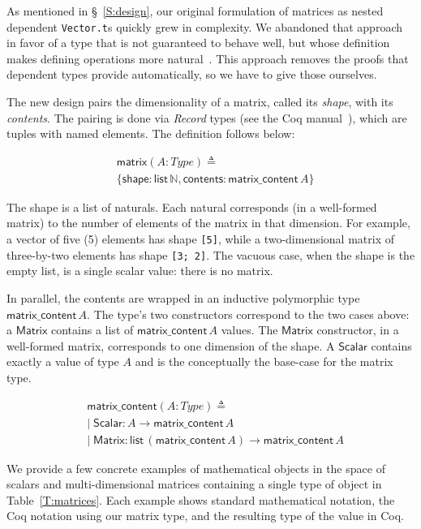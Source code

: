 \documentclass[11pt,conference]{IEEEtran}
\newcommand{\var}[1]{\mathit{#1}}
\newcommand{\func}[1]{\mathsf{#1}}
\theoremstyle{plain} %
\theoremstyle{definition}
\theoremstyle{remark}
\begin{document}
As mentioned in \S~\ref{S:design}, our original formulation of matrices as
nested dependent \texttt{Vector.t}s quickly grew in complexity. We abandoned
that approach in favor of a type that is not guaranteed to behave well, but
whose definition makes defining operations more natural~\cite{SO_2021_2}. This
approach removes the proofs that dependent types provide automatically, so we
have to give those ourselves.

The new design pairs the dimensionality of a matrix, called its \emph{shape},
with its \emph{contents}. The pairing is done via \emph{Record} types (see the
Coq manual~\cite{Coq}), which are tuples with named elements. The definition
follows below:

\begin{align*}
    & \func{matrix} (\var{A}: \var{Type}) \triangleq \\
    & \{
        \func{shape}: \func{list}\, \mathbb{N},
        \func{contents}: \func{matrix\_content}\, \var{A}
    \}
\end{align*}

The shape is a list of naturals. Each natural corresponds (in a well-formed
matrix) to the number of elements of the matrix in that dimension. For example,
a vector of five (5) elements has shape \texttt{[5]}, while a two-dimensional
matrix of three-by-two elements has shape \texttt{[3; 2]}. The vacuous case,
when the shape is the empty list, is a single scalar value: there is no matrix.

In parallel, the contents are wrapped in an inductive polymorphic type
\(\func{matrix\_content}\, \var{A}\). The type's two constructors correspond to
the two cases above: a \(\func{Matrix}\) contains a list of
\(\func{matrix\_content}\, \var{A}\) values. The \(\func{Matrix}\) constructor,
in a well-formed matrix, corresponds to one dimension of the shape. A
\(\func{Scalar}\) contains exactly a value of type \(\var{A}\) and is the
conceptually the base-case for the matrix type.

\begin{align*}
    & \func{matrix\_content} (\var{A}: \var{Type}) \triangleq\; \\
    & |\; \func{Scalar}: \var{A} \to \func{matrix\_content}\, \var{A} \\
    & |\; \func{Matrix}: \func{list}\, (\func{matrix\_content}\, \var{A}) \to \func{matrix\_content}\, \var{A}
\end{align*}

We provide a few concrete examples of mathematical objects in the space of
scalars and multi-dimensional matrices containing a single type of object in
Table~\ref{T:matrices}. Each example shows standard mathematical notation, the
Coq notation using our matrix type, and the resulting type of the value in Coq.
\end{document}
